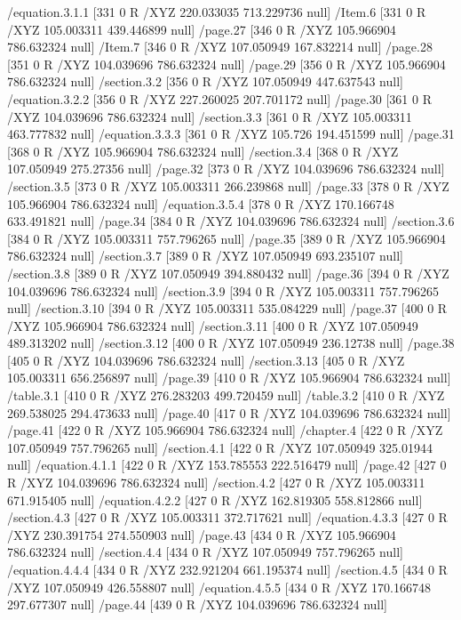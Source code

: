 {{{{{{{/equation.3.1.1 [331 0 R /XYZ 220.033035 713.229736 null]
/Item.6 [331 0 R /XYZ 105.003311 439.446899 null]
/page.27 [346 0 R /XYZ 105.966904 786.632324 null]
/Item.7 [346 0 R /XYZ 107.050949 167.832214 null]
/page.28 [351 0 R /XYZ 104.039696 786.632324 null]
/page.29 [356 0 R /XYZ 105.966904 786.632324 null]
/section.3.2 [356 0 R /XYZ 107.050949 447.637543 null]
/equation.3.2.2 [356 0 R /XYZ 227.260025 207.701172 null]
/page.30 [361 0 R /XYZ 104.039696 786.632324 null]
/section.3.3 [361 0 R /XYZ 105.003311 463.777832 null]
/equation.3.3.3 [361 0 R /XYZ 105.726 194.451599 null]
/page.31 [368 0 R /XYZ 105.966904 786.632324 null]
/section.3.4 [368 0 R /XYZ 107.050949 275.27356 null]
/page.32 [373 0 R /XYZ 104.039696 786.632324 null]
/section.3.5 [373 0 R /XYZ 105.003311 266.239868 null]
/page.33 [378 0 R /XYZ 105.966904 786.632324 null]
/equation.3.5.4 [378 0 R /XYZ 170.166748 633.491821 null]
/page.34 [384 0 R /XYZ 104.039696 786.632324 null]
/section.3.6 [384 0 R /XYZ 105.003311 757.796265 null]
/page.35 [389 0 R /XYZ 105.966904 786.632324 null]
/section.3.7 [389 0 R /XYZ 107.050949 693.235107 null]
/section.3.8 [389 0 R /XYZ 107.050949 394.880432 null]
/page.36 [394 0 R /XYZ 104.039696 786.632324 null]
/section.3.9 [394 0 R /XYZ 105.003311 757.796265 null]
/section.3.10 [394 0 R /XYZ 105.003311 535.084229 null]
/page.37 [400 0 R /XYZ 105.966904 786.632324 null]
/section.3.11 [400 0 R /XYZ 107.050949 489.313202 null]
/section.3.12 [400 0 R /XYZ 107.050949 236.12738 null]
/page.38 [405 0 R /XYZ 104.039696 786.632324 null]
/section.3.13 [405 0 R /XYZ 105.003311 656.256897 null]
/page.39 [410 0 R /XYZ 105.966904 786.632324 null]
/table.3.1 [410 0 R /XYZ 276.283203 499.720459 null]
/table.3.2 [410 0 R /XYZ 269.538025 294.473633 null]
/page.40 [417 0 R /XYZ 104.039696 786.632324 null]
/page.41 [422 0 R /XYZ 105.966904 786.632324 null]
/chapter.4 [422 0 R /XYZ 107.050949 757.796265 null]
/section.4.1 [422 0 R /XYZ 107.050949 325.01944 null]
/equation.4.1.1 [422 0 R /XYZ 153.785553 222.516479 null]
/page.42 [427 0 R /XYZ 104.039696 786.632324 null]
/section.4.2 [427 0 R /XYZ 105.003311 671.915405 null]
/equation.4.2.2 [427 0 R /XYZ 162.819305 558.812866 null]
/section.4.3 [427 0 R /XYZ 105.003311 372.717621 null]
/equation.4.3.3 [427 0 R /XYZ 230.391754 274.550903 null]
/page.43 [434 0 R /XYZ 105.966904 786.632324 null]
/section.4.4 [434 0 R /XYZ 107.050949 757.796265 null]
/equation.4.4.4 [434 0 R /XYZ 232.921204 661.195374 null]
/section.4.5 [434 0 R /XYZ 107.050949 426.558807 null]
/equation.4.5.5 [434 0 R /XYZ 170.166748 297.677307 null]
/page.44 [439 0 R /XYZ 104.039696 786.632324 null]
}}}}}}}
